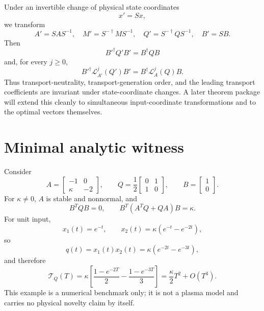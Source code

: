 \documentclass[11pt,a4paper]{article}
\newcommand{\Lin}{\mathcal{L}_A}
\begin{document}
Under an invertible change of physical state coordinates
\begin{equation}
  x'=Sx,
\end{equation}
we transform
\begin{equation}
  A'=SAS^{-1},\quad
  M'=S^{-\dagger}MS^{-1},\quad
  Q'=S^{-\dagger}QS^{-1},\quad
  B'=SB.
\end{equation}
Then
\begin{equation}
  B'^\dagger Q'B'=B^\dagger QB
\end{equation}
and, for every $j\ge0$,
\begin{equation}
  B'^\dagger\mathcal{L}_{A'}^j(Q')B'
  =B^\dagger\Lin^j(Q)B.
\end{equation}
Thus transport-neutrality, transport-generation order, and the leading transport coefficients are invariant under state-coordinate changes. A later theorem package will extend this cleanly to simultaneous input-coordinate transformations and to the optimal vectors themselves.

\section{Minimal analytic witness}

Consider
\begin{equation}
  A=\begin{bmatrix}-1&0\\ \kappa&-2\end{bmatrix},
  \qquad
  Q=\frac12\begin{bmatrix}0&1\\1&0\end{bmatrix},
  \qquad
  B=\begin{bmatrix}1\\0\end{bmatrix}.
\end{equation}
For $\kappa\neq0$, $A$ is stable and nonnormal, and
\begin{equation}
  B^TQB=0,
  \qquad
  B^T(A^TQ+QA)B=\kappa.
\end{equation}
For unit input,
\begin{equation}
  x_1(t)=e^{-t},
  \qquad
  x_2(t)=\kappa(e^{-t}-e^{-2t}),
\end{equation}
so
\begin{equation}
  q(t)=x_1(t)x_2(t)=\kappa(e^{-2t}-e^{-3t}),
\end{equation}
and therefore
\begin{equation}
  \mathcal{T}_Q(T)
  =\kappa\left[\frac{1-e^{-2T}}{2}-\frac{1-e^{-3T}}{3}\right]
  =\frac{\kappa}{2}T^2+O(T^3).
\end{equation}
This example is a numerical benchmark only; it is not a plasma model and carries no physical novelty claim by itself.
\end{document}
